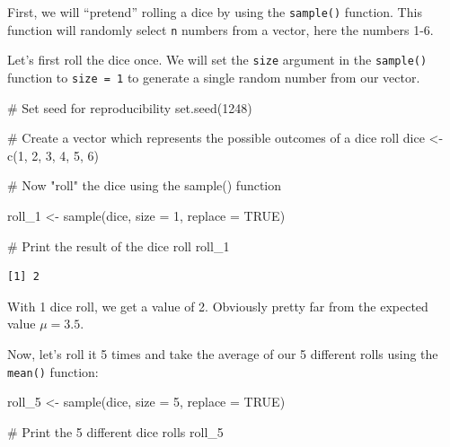 \documentclass[
  letterpaper,
  DIV=11,
  numbers=noendperiod]{scrreprt}
\newenvironment{Shaded}{\begin{snugshade}}{\end{snugshade}}
\newcommand{\AttributeTok}[1]{\textcolor[rgb]{0.40,0.45,0.13}{#1}}
\newcommand{\CommentTok}[1]{\textcolor[rgb]{0.37,0.37,0.37}{#1}}
\newcommand{\ConstantTok}[1]{\textcolor[rgb]{0.56,0.35,0.01}{#1}}
\newcommand{\DecValTok}[1]{\textcolor[rgb]{0.68,0.00,0.00}{#1}}
\newcommand{\FunctionTok}[1]{\textcolor[rgb]{0.28,0.35,0.67}{#1}}
\newcommand{\NormalTok}[1]{\textcolor[rgb]{0.00,0.23,0.31}{#1}}
\newcommand{\OtherTok}[1]{\textcolor[rgb]{0.00,0.23,0.31}{#1}}
\begin{document}
First, we will ``pretend'' rolling a dice by using the \texttt{sample()}
function. This function will randomly select \texttt{n} numbers from a
vector, here the numbers 1-6.

Let's first roll the dice once. We will set the \texttt{size} argument
in the \texttt{sample()} function to \texttt{size\ =\ 1} to generate a
single random number from our vector.

\begin{Shaded}
\begin{Highlighting}[]
\CommentTok{\# Set seed for reproducibility}
\FunctionTok{set.seed}\NormalTok{(}\DecValTok{1248}\NormalTok{)}

\CommentTok{\# Create a vector which represents the possible outcomes of a dice roll}
\NormalTok{dice }\OtherTok{\textless{}{-}} \FunctionTok{c}\NormalTok{(}\DecValTok{1}\NormalTok{, }\DecValTok{2}\NormalTok{, }\DecValTok{3}\NormalTok{, }\DecValTok{4}\NormalTok{, }\DecValTok{5}\NormalTok{, }\DecValTok{6}\NormalTok{)}

\CommentTok{\# Now "roll" the dice using the sample() function}

\NormalTok{roll\_1 }\OtherTok{\textless{}{-}} \FunctionTok{sample}\NormalTok{(dice, }\AttributeTok{size =} \DecValTok{1}\NormalTok{, }\AttributeTok{replace =} \ConstantTok{TRUE}\NormalTok{)}

\CommentTok{\# Print the result of the dice roll}
\NormalTok{roll\_1}
\end{Highlighting}
\end{Shaded}

\begin{verbatim}
[1] 2
\end{verbatim}

With 1 dice roll, we get a value of 2. Obviously pretty far from the
expected value \(\mu = 3.5\).

Now, let's roll it 5 times and take the average of our 5 different rolls
using the \texttt{mean()} function:

\begin{Shaded}
\begin{Highlighting}[]
\NormalTok{roll\_5 }\OtherTok{\textless{}{-}} \FunctionTok{sample}\NormalTok{(dice, }\AttributeTok{size =} \DecValTok{5}\NormalTok{, }\AttributeTok{replace =} \ConstantTok{TRUE}\NormalTok{)}

\CommentTok{\# Print the 5 different dice rolls}
\NormalTok{roll\_5}
\end{Highlighting}
\end{Shaded}
\end{document}
